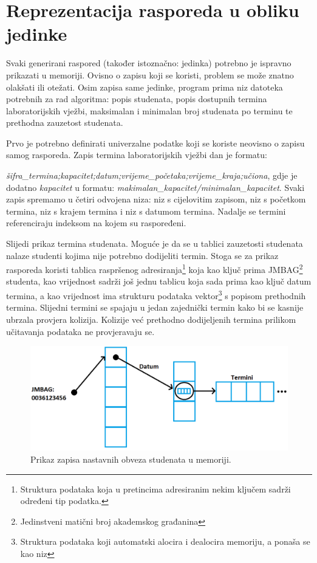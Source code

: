 \documentclass[times, utf8, zavrsni]{fer}
\begin{document}
\section{Reprezentacija rasporeda u obliku jedinke}

Svaki generirani raspored (također istoznačno: jedinka) potrebno je ispravno prikazati u memoriji. Ovisno o zapisu koji se koristi, problem se može znatno olakšati ili otežati. Osim zapisa same jedinke, program prima niz datoteka potrebnih za rad algoritma: popis studenata, popis dostupnih termina laboratorijskih vježbi, maksimalan i minimalan broj studenata po terminu te prethodna zauzetost studenata.

Prvo je potrebno definirati univerzalne podatke koji se koriste neovisno o zapisu samog rasporeda. Zapis termina laboratorijskih vježbi dan je formatu:

\emph{šifra\_termina;kapacitet;datum;vrijeme\_početaka;vrijeme\_kraja;učiona}, gdje je dodatno \emph{kapacitet} u formatu: \emph{makimalan\_kapacitet/minimalan\_kapacitet}. Svaki zapis spremamo u četiri odvojena niza: niz s cijelovitim zapisom, niz s početkom termina, niz s krajem termina i niz s datumom termina. Nadalje se termini referenciraju indeksom na kojem su raspoređeni.

Slijedi prikaz termina studenata. Moguće je da se u tablici zauzetosti studenata nalaze studenti kojima nije potrebno dodijeliti termin. Stoga se za prikaz rasporeda koristi tablica raspršenog adresiranja\footnote{Struktura podataka koja u pretincima adresiranim nekim ključem sadrži određeni tip podatka.} koja kao ključ prima JMBAG\footnote{Jedinstveni matični broj akademskog građanina} studenta, kao vrijednost sadrži još jednu tablicu koja sada prima kao ključ datum termina, a kao vrijednost ima strukturu podataka vektor\footnote{Struktura podataka koji automatski alocira i dealocira memoriju, a ponaša se kao niz} s popisom prethodnih termina. Slijedni termini se spajaju u jedan zajednički termin kako bi se kasnije ubrzala provjera kolizija. Kolizije već prethodno dodijeljenih termina prilikom učitavanja podataka ne provjeravaju se.

\begin{figure}[htb]
\centering
\includegraphics[width=15cm]{images/prikaz_termina.png}
\caption{Prikaz zapisa nastavnih obveza studenata u memoriji.}
\label{fig:prikaz_termina}
\end{figure}
\end{document}
